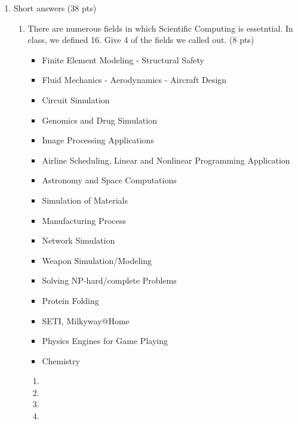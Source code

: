 \documentclass[10pt]{article}
\begin{document}
\begin{enumerate}

\item Short answers (38 pts)

\begin{enumerate}
	\item There are numerous fields in which Scientific Computing is essetntial. In class, we defined 16.  Give 4 of the fields we called out. (8 pts)

\beginanswers
\begin{itemize}
\item Finite Element Modeling - Structural Safety
\item Fluid Mechanics - Aerodynamics - Aircraft Design
\item Circuit Simulation
\item Genomics and Drug Simulation
\item Image Processing Applications
\item Airline Scheduling, Linear and Nonlinear Programming Application
\item Astronomy and Space Computations
\item Simulation of Materials
\item Manufacturing Process
\item Network Simulation
\item Weapon Simulation/Modeling
\item Solving NP-hard/complete Problems
\item Protein Folding
\item SETI, Milkyway@Home
\item Physics Engines for Game Playing
\item Chemistry
\end{itemize}
\else
	\begin{enumerate}
	\item 
	\bigskip
	\bigskip
	\item
	\bigskip
	\bigskip
	\item 
	\bigskip
	\bigskip
	\item
	\bigskip
	\bigskip
\end{enumerate}
\fi
	\bigskip
	\bigskip


\end{enumerate}
\end{enumerate}
\end{document}
